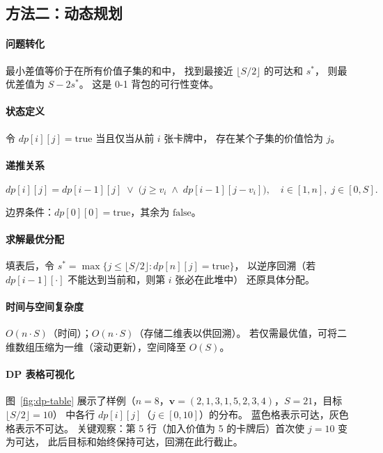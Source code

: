 \documentclass[12pt, a4paper]{ctexart}
\begin{document}
\subsection{方法二：动态规划}

\paragraph{问题转化}
最小差值等价于在所有价值子集的和中，
找到最接近 $\lfloor S/2 \rfloor$ 的可达和 $s^*$，
则最优差值为 $S - 2s^*$。
这是 0-1 背包的可行性变体。

\paragraph{状态定义}
令 $\textit{dp}[i][j] = \text{true}$ 当且仅当从前 $i$ 张卡牌中，
存在某个子集的价值恰为 $j$。

\paragraph{递推关系}
\begin{equation}
  \textit{dp}[i][j] =
  \textit{dp}[i-1][j]
  \;\lor\;
  \bigl(j \ge v_i \;\land\; \textit{dp}[i-1][j-v_i]\bigr),
  \quad i \in [1,n],\; j \in [0, S].
  \label{eq:dp}
\end{equation}

边界条件：$\textit{dp}[0][0] = \text{true}$，其余为 $\text{false}$。

\paragraph{求解最优分配}
填表后，令 $s^* = \max\{j \le \lfloor S/2 \rfloor : \textit{dp}[n][j] = \text{true}\}$，
以逆序回溯（若 $\textit{dp}[i-1][\cdot]$ 不能达到当前和，则第 $i$ 张必在此堆中）
还原具体分配。

\paragraph{时间与空间复杂度} $O(n \cdot S)$（时间）；$O(n \cdot S)$（存储二维表以供回溯）。
若仅需最优值，可将二维数组压缩为一维（滚动更新），空间降至 $O(S)$。

\paragraph{DP 表格可视化}

图~\ref{fig:dp-table} 展示了样例（$n=8$，$\mathbf{v}=(2,1,3,1,5,2,3,4)$，$S=21$，目标 $\lfloor S/2 \rfloor = 10$）
中各行 $\textit{dp}[i][j]$（$j \in [0, 10]$）的分布。
蓝色格表示可达，灰色格表示不可达。
关键观察：第 5 行（加入价值为 5 的卡牌后）首次使 $j=10$ 变为可达，
此后目标和始终保持可达，回溯在此行截止。
\end{document}
